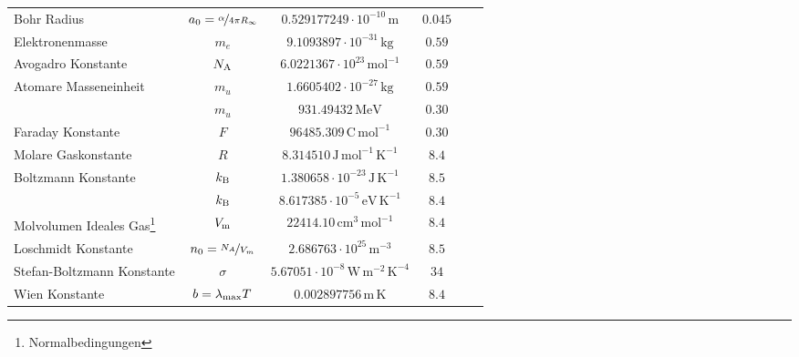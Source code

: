 \begin{table}[hb]
\begin{tabular}{p{5cm}ccccc}
%
 Bohr Radius & $a_0=\nicefrac{\alpha}{4 \pi R_\infty}$ & $\mathrm{0.529177249\cdot 10^{-10}\,m}$ & $\mathrm{0.045}$ \\
%
 Elektronenmasse & $m_e$ & $\mathrm{9.1093897\cdot 10^{-31}\,kg}$ & $\mathrm{0.59}$ \\
%
 Avogadro Konstante & $N_{\rm A}$ & $\mathrm{6.0221367\cdot 10^{23}\,mol^{-1}}$ & $\mathrm{0.59}$ \\
%
 Atomare Masseneinheit & $m_u$ & $\mathrm{1.6605402\cdot 10^{-27}\,kg}$ & $\mathrm{0.59}$ \\
%
          & $m_u$ & $\mathrm{931.49432\,MeV}$ & $\mathrm{0.30}$ \\
%
 Faraday Konstante & $F$ & $\mathrm{96485.309\,C\, mol^{-1}}$ & $\mathrm{0.30}$ \\
%
 Molare Gaskonstante & $R$ & $\mathrm{8.314510\,J \, mol^{-1} \, K^{-1}}$ & $\mathrm{8.4}$ \\
%
 Boltzmann Konstante & $k_{\rm B}$ & $\mathrm{1.380658\cdot 10^{-23}\,J \, K^{-1}}$ & $\mathrm{8.5}$ \\
%
           & $k_{\rm B}$ & $\mathrm{8.617385\cdot 10^{-5}\,eV \, K^{-1}}$ & $\mathrm{8.4}$ \\
%
 Molvolumen Ideales Gas\footnote{Normalbedingungen} & $V_{\rm m}$ & $\mathrm{22414.10\,cm^3 \, mol^{-1}}$ & $\mathrm{8.4}$ \\
%
 Loschmidt Konstante & $n_0=\nicefrac{N_A}{V_m}$ & $\mathrm{2.686763\cdot 10^{25}\,m^{-3}}$ & $\mathrm{8.5}$ \\
%
 Stefan-Boltzmann Konstante & $\sigma$ & $\mathrm{5.67051\cdot 10^{-8}\,W\, m^{-2} \, K^{-4}}$ & $\mathrm{34}$ \\
%
 Wien Konstante & $b=\lambda_{\rm max}T$ & $\mathrm{0.002897756\,m \, K}$ & $\mathrm{8.4}$ \\
%
 \hline
  \end{tabular}
\end{table}



